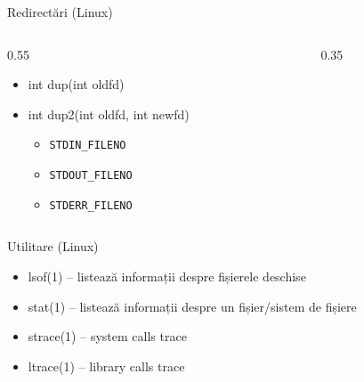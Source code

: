 \documentclass{so.cs.pub.ro}
\begin{document}
\begin{frame}{Redirectări (Linux)}
      \begin{columns}
	\begin{column} [1]{0.55\textwidth}
  \begin{itemize}
    \item int dup(int oldfd)
    \vspace*{0.2cm}
    \item int dup2(int oldfd, int newfd)
    \begin{itemize}
      \item \texttt{STDIN_FILENO}
      \item \texttt{STDOUT_FILENO}
      \item \texttt{STDERR_FILENO}
    \end{itemize}
  \end{itemize}
	\end{column}
	\begin{column} [1]{0.35\textwidth}
	\end{column}
      \end{columns}
\end{frame}

\begin{frame}{Utilitare (Linux)}
  \begin{itemize}
    \item lsof(1) – listează informații despre fișierele deschise
    \vspace*{0.1cm}
    \item stat(1) – listează informații despre un fișier/sistem de fișiere
    \vspace*{0.1cm}
    \item strace(1) – system calls trace
    \vspace*{0.1cm}
    \item ltrace(1) – library calls trace
  \end{itemize}
\end{frame}

\end{document}
